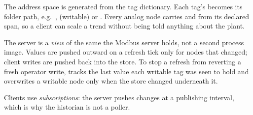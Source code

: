 The address space is generated from the tag dictionary. Each tag's
 becomes its folder path, e.g.\ ,
 (writable) or .
Every analog node carries  and  from its
declared span, so a client can scale a trend without being told anything about
the plant.

The server is a \emph{view} of the same  the Modbus server
holds, not a second process image. Values are pushed outward on a refresh tick
only for nodes that changed; client writes are pushed back into the store. To
stop a refresh from reverting a fresh operator write,  tracks
the last value each writable tag was seen to hold and overwrites a writable
node only when the store changed underneath it.

Clients use \emph{subscriptions}: the server pushes changes at a publishing
interval, which is why the historian is not a poller.
